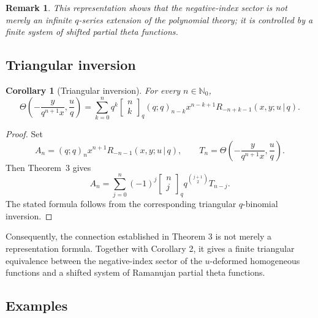\documentclass[12pt]{article}
\newtheorem{corollary}{Corollary}
\newtheorem{remark}{Remark}
\begin{document}
\begin{remark}
This representation shows that the negative-index sector is not merely an infinite \(q\)-series extension of the polynomial theory; it is controlled by a finite system of shifted partial theta functions.
\end{remark}

\subsection{Triangular inversion}



\begin{corollary}[Triangular inversion]
For every \(n\in\mathbb N_0\),
\[
\Theta\left(
-\frac{y}{q^{n+1}x},
\frac{u}{q}
\right)
=
\sum_{k=0}^{n}
q^k
\begin{bmatrix}
n\\ k
\end{bmatrix}_q
(q;q)_{n-k}
x^{n-k+1}
R_{-n+k-1}(x,y;u\,|\,q).
\]
\end{corollary}
\begin{proof}
Set \[ A_n=(q;q)_n x^{n+1}R_{-n-1}(x,y;u\,|\,q), \qquad T_n=\Theta\left(-\frac{y}{q^{n+1}x},\frac{u}{q}\right). \] Then Theorem~3 gives \[ A_n=\sum_{j=0}^n (-1)^j \begin{bmatrix}n\\j\end{bmatrix}_q q^{\binom{j+1}{2}} T_{n-j}. \] The stated formula follows from the corresponding triangular \(q\)-binomial inversion.
\end{proof}

Consequently, the connection established in Theorem 3 is not merely a representation formula. Together with Corollary 2, it gives a finite triangular equivalence between the negative-index sector of the \(u\)-deformed homogeneous functions and a shifted system of Ramanujan partial theta functions.

\subsection{Examples}
\end{document}
